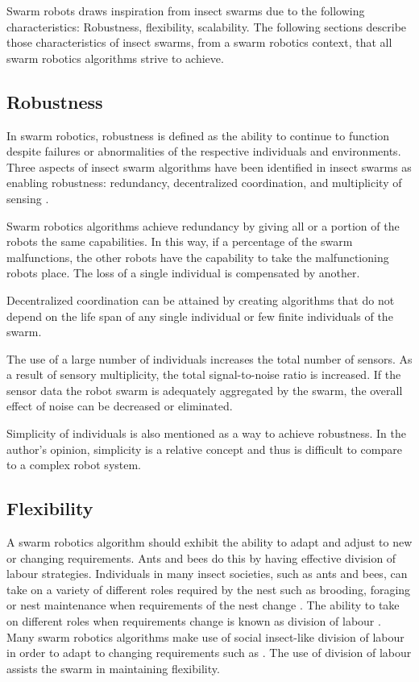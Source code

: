 Swarm robots draws inspiration from insect swarms due to the following characteristics: Robustness, flexibility, scalability. The following sections describe those characteristics of insect swarms, from a swarm robotics context, that all swarm robotics algorithms strive to achieve. 

\subsection{Robustness}
\label{robustness}

In swarm robotics, robustness is defined as the ability to continue to function despite failures or abnormalities of the respective individuals and environments. Three aspects of insect swarm algorithms have been identified  in insect swarms as enabling robustness: redundancy, decentralized coordination, and multiplicity of sensing \cite{csahin2005swarm}.

Swarm robotics algorithms achieve redundancy by giving all or a portion of the robots the same capabilities. In this way, if a percentage  of the swarm malfunctions, the other robots have the capability to take the malfunctioning robots place. The loss of a single individual is compensated by another.

Decentralized coordination can be attained by creating algorithms that do not depend on the life span of any single individual or few finite individuals of the swarm.

The use of a large number of individuals increases the total number of sensors.  As a result of sensory multiplicity, the total signal-to-noise ratio is increased. If the sensor data the robot swarm is adequately aggregated by the swarm, the overall effect of noise can be decreased or eliminated. 

Simplicity of individuals is also mentioned as a way to achieve robustness. In the author's opinion, simplicity is a relative concept and thus is difficult to compare to a complex robot system. 

\subsection{Flexibility}

A swarm robotics algorithm should exhibit the ability to adapt and adjust to new or changing requirements. Ants and bees do this by having effective division of labour strategies. Individuals in many insect societies, such as ants and bees, can take on a variety of different roles required by the nest such as brooding, foraging or nest maintenance when requirements of the nest change \cite{morley1946division}. The ability to take on different roles when requirements change is known as division of labour \cite{beshers2001models}. Many swarm robotics algorithms make use of social insect-like division of labour in order to adapt to changing requirements such as \cite{labella2006division, liu2007towards, gerkey2004formal}. The use of division of labour assists the swarm in maintaining flexibility.

